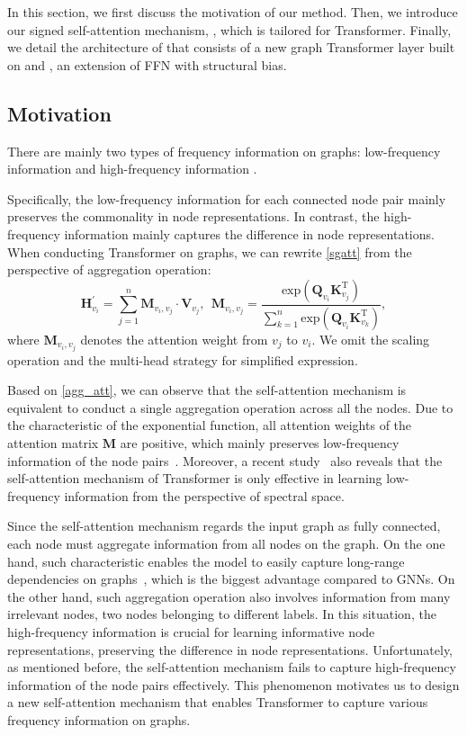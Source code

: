 \documentclass[sigconf, screen]{acmart}
\begin{document}
In this section, we first discuss the motivation of our method.
Then, we introduce our signed self-attention mechanism, \saname, which is tailored for Transformer.
Finally, we detail the architecture of \name that consists of a new graph Transformer layer built on \saname and \sffn, an extension of FFN with structural bias.

\subsection{Motivation}
There are mainly two types of frequency information on graphs: low-frequency information and high-frequency information \cite{fagcn}.

Specifically, the low-frequency information for each connected node pair mainly preserves the commonality in node representations. 
In contrast, the high-frequency information mainly captures the difference in node representations.
When conducting Transformer on graphs, we can rewrite \autoref{sgatt} from the perspective of aggregation operation:
\begin{equation}
    \mathbf{H}^{\prime}_{v_i} = \sum_{j=1}^{n} \mathbf{M}_{v_i, v_j} \cdot \mathbf{V}_{v_j}, ~~
    \mathbf{M}_{v_i, v_j} = 
    \frac{\mathrm{exp}(\mathbf{Q}_{v_i}
    \mathbf{K}_{v_j}^{\mathrm{T}})}
    {\sum_{k=1}^{n}\mathrm{exp}(\mathbf{Q}_{v_i}
    \mathbf{K}_{v_k}^{\mathrm{T}})},
    \label{agg_att}
\end{equation}
where $\mathbf{M}_{v_i, v_j}$ denotes the attention weight from $v_j$ to $v_i$.
We omit the scaling operation and the multi-head strategy for simplified expression.

Based on \autoref{agg_att}, we can observe that the self-attention mechanism 
is equivalent to conduct a single 
aggregation operation across all the nodes.
Due to the characteristic of the exponential function, all attention weights of the attention matrix $\mathbf{M}$ are positive, which mainly preserves low-frequency information of the node pairs~\cite{fagcn}.
Moreover, a recent study~\cite{feta} also reveals that the self-attention mechanism of Transformer is only effective in learning low-frequency information from the perspective of spectral space.

Since the self-attention mechanism regards the input graph as fully connected, each node must aggregate information from all nodes on the graph.
On the one hand, such characteristic enables the model to easily capture long-range dependencies on graphs~\cite{graphtrans}, which is the biggest advantage compared to GNNs.
On the other hand, such aggregation operation also involves information from many irrelevant nodes, \eg two nodes belonging to different labels.
In this situation, the high-frequency information is crucial for learning informative node representations, \ie preserving the difference in node representations.
Unfortunately, as mentioned before, the self-attention mechanism fails to capture high-frequency information of the node pairs effectively.
This phenomenon motivates us to design a new self-attention mechanism that enables Transformer to capture various frequency information on graphs.
  
\end{document}
